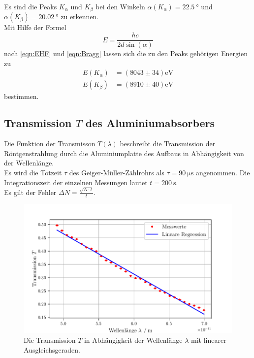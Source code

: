 \noindent Es sind die Peaks $K_{\alpha}$ und $K_{\beta}$ bei den Winkeln $\alpha(K_{\alpha})= \SI{22,5}{\degree}$ 
und $\alpha(K_{\beta}) = \SI{20,02}{\degree}$ zu erkennen.\\

\noindent Mit Hilfe der Formel
\begin{equation*}
  E = \frac{hc}{2d\sin\left(\alpha\right)}
\end{equation*}
nach \eqref{eqn:EHF} und \eqref{eqn:Bragg} lassen sich die zu den Peaks gehörigen Energien zu
\begin{align*}
  E(K_{\alpha}) &= (8043 \pm 34)\unit{\electronvolt} \\
  E(K_{\beta}) &= (8910 \pm 40)\unit{\electronvolt}
\end{align*}
bestimmen.




\subsection{Transmission $T$ des Aluminiumabsorbers}
\label{subsec:transmission}

Die Funktion der Transmisson $T(\lambda)$ beschreibt die Transmission der 
Röntgenstrahlung durch die Aluminiumplatte des Aufbaus in Abhängigkeit von der Wellenlänge.\\

\noindent Es wird die Totzeit $\tau$ des Geiger-Müller-Zählrohrs als $\tau = \SI{90}{\micro\second}$ angenommen. Die 
Integrationszeit der einzelnen Messungen lautet $t = \SI{200}{\second}$. \\
Es gilt der Fehler $\Delta N = \frac{\sqrt{N \cdot t}}{t}$.\\


\begin{figure}[H]
  \centering
  \includegraphics{build/transmission.pdf}
  \caption{Die Transmission $T$ in Abhängigkeit der Wellenlänge $\lambda$ mit linearer Ausgleichsgeraden.}
  \label{fig:transm}
\end{figure}

